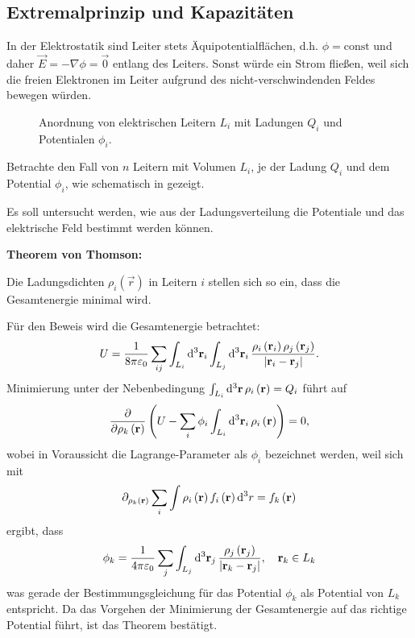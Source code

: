 \subsection{Extremalprinzip und Kapazitäten}

\begin{formal}
	In der Elektrostatik sind Leiter stets Äquipotentialflächen, d.h. $\phi =\text{const}$ und daher $\vec {E}=-\nabla \phi =\vec {0}$ entlang des Leiters. Sonst würde ein Strom fließen, weil sich die freien Elektronen im Leiter aufgrund des nicht-verschwindenden Feldes bewegen würden.
\end{formal}

\begin{figure}[htb]
	\centering
	\tfigThreeConductors
	\caption{Anordnung von elektrischen Leitern $L_i$ mit Ladungen $Q_i$ und Potentialen $\phi_i$. }
	\label{fig:three_conductors}
\end{figure}

Betrachte den Fall von $n$ Leitern mit Volumen $L_{i}$, je der Ladung $Q_{i}$ und dem Potential $\phi _{i}$, wie schematisch in  gezeigt.

Es soll untersucht werden, wie aus der Ladungsverteilung die Potentiale und das elektrische Feld bestimmt werden können.
\begin{formal}
	\textbf{Theorem von Thomson:}

	Die Ladungsdichten $\rho _{i}\left(\vec {r}\right)$ in Leitern $i$ stellen sich so ein, dass die Gesamtenergie minimal wird.
\end{formal}
Für den Beweis wird die Gesamtenergie betrachtet:
\begin{equation*}
	U=\frac{1}{8\pi \varepsilon _{0}}\sum _{ij}\int _{L_{i}}\diffa[3]{\vec {r}_{i}}\int _{L_{j}}\diffa[3]{\vec {r}_{i}}\frac{\rho _{i}\left(\vec {r}_{i}\right)\rho _{j}\left(\vec {r}_{j}\right)}{\left| \vec {r}_{i}-\vec {r}_{j}\right| }.
\end{equation*}
Minimierung unter der Nebenbedingung $\int _{{L_{i}}}\diffa[3]{\vec {r}}\rho _{i}\left(\vec {r}\right)=Q_{i}$ führt auf
\begin{equation*}
	\frac{\partial }{\partial \rho _{k}\left(\vec {r}\right)}\left(U-\sum _{i}\phi _{i}\int _{L_{i}}\diffa[3]{\vec {r}_{i}}\rho _{i}\left(\vec {r}\right)\right)=0,
\end{equation*}
wobei in Voraussicht die Lagrange-Parameter als $\phi _{i}$ bezeichnet werden, weil sich mit
\begin{equation*}
	\partial _{{\rho _{k}}\left(\vec {r}\right)}\sum _{i}\int \rho _{i}\left(\vec {r}\right)f_{i}\left(\vec {r}\right)\diff ^{3}r=f_{k}\left(\vec {r}\right)
\end{equation*}
ergibt, dass
\begin{equation*}
	\phi _{k}=\frac{1}{4\pi \varepsilon _{0}}\sum _{j}\int _{L_{j}}\diffa[3]{\vec {r}_{j}}\frac{\rho _{j}\left(\vec {r}_{j}\right)}{\left| \vec {r}_{k}-\vec {r}_{j}\right| },\quad \vec {r}_{k}\in L_{k}
\end{equation*}
was gerade der Bestimmungsgleichung für das Potential $\phi _{k}$ als Potential von $L_{k}$ entspricht. Da das Vorgehen der Minimierung der Gesamtenergie auf das richtige Potential führt, ist das Theorem bestätigt.


